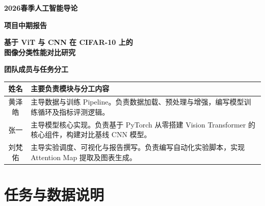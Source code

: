 \documentclass[a4paper, 12pt]{article}
\begin{document}
\begin{titlepage}
    \centering
    \vspace*{3cm}
    
    {\Huge \bfseries 2026春季人工智能导论\par}
    \vspace{1cm}
    {\LARGE \bfseries 项目中期报告\par}
    \vspace{1.5cm}
    
    {\Large \bfseries 基于 ViT 与 CNN 在 CIFAR-10 上的 \\ 图像分类性能对比研究\par}
    \vspace{3cm}
    
    {\large \bfseries 团队成员与任务分工}\par
    \vspace{0.5cm}
    
    \begin{table}[H]
    \centering
    \renewcommand{\arraystretch}{1.5}
    \begin{tabularx}{0.9\textwidth}{c|X}
        \toprule
        \textbf{姓名} & \textbf{主要负责模块与分工内容} \\
        \midrule
        黄泽皓 & 主导数据与训练 Pipeline。负责数据加载、预处理与增强，编写模型训练循环及指标评测逻辑。 \\
        \hline
        张一 & 主导模型核心实现。负责基于 PyTorch 从零搭建 Vision Transformer 的核心组件，构建对比基线 CNN 模型。 \\
        \hline
        刘梵佑 & 主导实验调度、可视化与报告撰写。负责编写自动化实验脚本，实现 Attention Map 提取及图表生成。 \\
        \bottomrule
    \end{tabularx}
\end{table}
    
    \vfill
\end{titlepage}

\newpage

\section{任务与数据说明}
\end{document}
